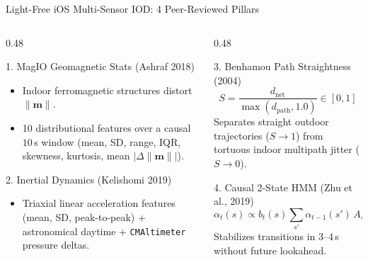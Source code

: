 \documentclass[aspectratio=169,10pt]{beamer}
\begin{document}
\begin{frame}{Light-Free iOS Multi-Sensor IOD: 4 Peer-Reviewed Pillars}
  \begin{columns}[T]
    \begin{column}{0.48\textwidth}
      \begin{block}{1. MagIO Geomagnetic Stats (Ashraf 2018)}
        \begin{itemize}\small
          \item Indoor ferromagnetic structures distort $\|\mathbf{m}\|$.
          \item 10 distributional features over a causal $10$\,s window (mean, SD, range, IQR, skewness, kurtosis, mean $|\Delta\|\mathbf{m}\||$).
        \end{itemize}
      \end{block}
      \vspace{0.15cm}
      \begin{block}{2. Inertial Dynamics (Kelishomi 2019)}
        \begin{itemize}\small
          \item Triaxial linear acceleration features (mean, SD, peak-to-peak) + astronomical daytime + \texttt{CMAltimeter} pressure deltas.
        \end{itemize}
      \end{block}
    \end{column}
    \begin{column}{0.48\textwidth}
      \begin{block}{3. Benhamou Path Straightness (2004)}
        \[
          S = \frac{d_{\text{net}}}{\max(d_{\text{path}}, 1.0)} \in [0, 1]
        \]
        \footnotesize Separates straight outdoor trajectories ($S\to 1$) from tortuous indoor multipath jitter ($S\to 0$).
      \end{block}
      \vspace{0.15cm}
      \begin{block}{4. Causal 2-State HMM (Zhu et al., 2019)}
        \[
          \alpha_t(s) \propto b_t(s)\sum_{s'} \alpha_{t-1}(s')\, A_{s',s}
        \]
        \footnotesize Stabilizes transitions in $3$--$4$\,s without future lookahead.
      \end{block}
    \end{column}
  \end{columns}
\end{frame}
\end{document}
